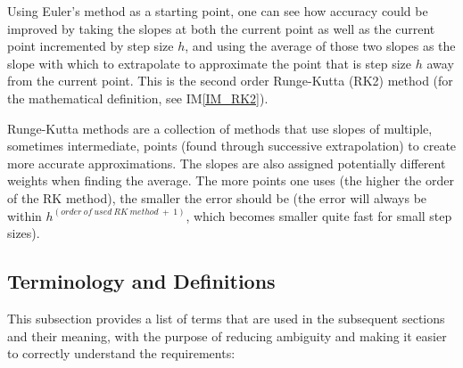 \documentclass[12pt]{article}
\newcommand{\iref}[1]{IM\ref{#1}}
\begin{document}
Using Euler's method as a starting point, one can see how accuracy could be 
improved by 
taking the slopes at both the current point as well as the current point 
incremented by step 
size $h$, and using the average of those two slopes as the slope with which to 
extrapolate to approximate the point that is step size $h$ away from the 
current 
point. This is the second order Runge-Kutta (RK2) method (for the mathematical 
definition, see \iref{IM_RK2}).

Runge-Kutta methods are a collection of methods that use slopes of multiple, 
sometimes intermediate, points (found through successive extrapolation) to 
create more accurate approximations. The slopes are also assigned potentially 
different weights when finding the average. The more points one uses (the 
higher the order of the RK method), the smaller the error should be (the error 
will always be within $h^{(order\ of\ used\ RK\ method\ +\ 1)}$, which becomes
smaller quite fast for small step sizes).

\subsection{Terminology and  Definitions}

This subsection provides a list of terms that are used in the subsequent
sections and their meaning, with the purpose of reducing ambiguity and making it
easier to correctly understand the requirements:
\end{document}
